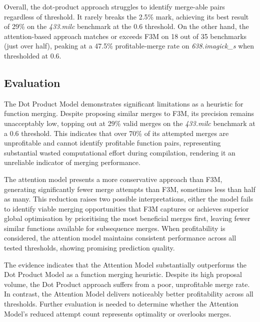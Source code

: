 Overall, the dot‐product approach struggles to identify merge-able pairs regardless of threshold. It rarely breaks the 2.5\% mark, achieving its best result of 29\% on the \textit{433.milc} benchmark at the 0.6 threshold. On the other hand, the attention-based approach matches or exceeds F3M on 18 out of 35 benchmarks (just over half), peaking at a 47.5\% profitable‐merge rate on \textit{638.imagick\_s} when thresholded at 0.6.

\subsection{Evaluation}
The Dot Product Model demonstrates significant limitations as a heuristic for function merging. Despite proposing similar merges to F3M, its precision remains unacceptably low, topping out at 29\% valid merges on the \textit{433.milc} benchmark at a 0.6 threshold. This indicates that over 70\% of its attempted merges are unprofitable and cannot identify profitable function pairs, representing substantial wasted computational effort during compilation, rendering it an unreliable indicator of merging performance.

The attention model presents a more conservative approach than F3M, generating significantly fewer merge attempts than F3M, sometimes less than half as many. This reduction raises two possible interpretations, either the model fails to identify viable merging opportunities that F3M captures or achieves superior global optimisation by prioritising the most beneficial merges first, leaving fewer similar functions available for subsequence merges. When profitability is considered, the attention model maintains consistent performance across all tested thresholds, showing promising prediction quality.

The evidence indicates that the Attention Model substantially outperforms the Dot Product Model as a function merging heuristic. Despite its high proposal volume, the Dot Product approach suffers from a poor, unprofitable merge rate. In contrast, the Attention Model delivers noticeably better profitability across all thresholds. Further evaluation is needed to determine whether the Attention Model's reduced attempt count represents optimality or overlooks merges.



